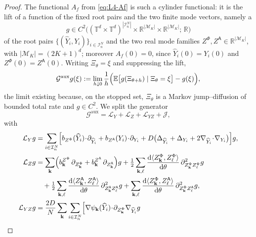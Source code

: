 \documentclass[a4paper,fleqn]{cas-sc}
\theoremstyle{definition}
\theoremstyle{remark}
\begin{document}
\begin{proof}
The functional $A_f$ from \eqref{eq:L4-Af} is such a cylinder functional: it is the lift of a
function of the fixed root pairs and the two finite mode vectors, namely a
\[
g\in C^2\bigl((\mathbb T^d\times\mathbb T^d)^{|\mathcal I^N_n|}\times\mathbb R^{|\mathcal M_K|}\times\mathbb R^{|\mathcal M_K|};\,\mathbb R\bigr)
\]
of the root pairs $\{(\widehat Y_i,Y_i)\}_{i\in\mathcal I^N_n}$ and the two real mode families
$Z^\Phi,Z^{\mathsf A}\in\mathbb R^{|\mathcal M_K|}$, with $|\mathcal M_K|=(2K+1)^d$; moreover $A_f(0)=0$,
since $\widehat Y_i(0)=Y_i(0)$ and $Z^\Phi(0)=Z^{\mathsf A}(0)$. Writing $\Xi_\theta=\xi$ and
suppressing the lift,
\begin{equation}\label{eq:L4-gendef}
\mathcal G^{\mathrm{aux}}g(\xi)
:=\lim_{h\downarrow0}\frac1h\Bigl(\mathbb E\bigl[g(\Xi_{\theta+h})\mid\Xi_\theta=\xi\bigr]-g(\xi)\Bigr),
\end{equation}
the limit existing because, on the stopped set, $\Xi_\theta$ is a Markov jump--diffusion of bounded
total rate and $g\in C^2$.
We split the generator
\begin{equation}\label{eq:L4-split}
\mathcal G^{\mathrm{aux}}=\mathcal L_Y+\mathcal L_Z+\mathcal L_{YZ}+\mathcal J,
\end{equation}
with
\begin{equation}\label{eq:L4-genops}
\begin{aligned}
\mathcal L_Yg&=\sum_{i\in\mathcal I^N_n}\Bigl[
b_{Z^\Phi}(\widehat Y_i)\!\cdot\!\partial_{\widehat Y_i}
+b_{Z^{\mathsf A}}(Y_i)\!\cdot\!\partial_{Y_i}
+D\bigl(\Delta_{\widehat Y_i}+\Delta_{Y_i}+2\nabla_{\widehat Y_i}\!\cdot\!\nabla_{Y_i}\bigr)\Bigr]g,\\
\mathcal L_Zg&=\sum_{\mathbf k}\Bigl(b^{Z^\Phi}_{\mathbf k}\,\partial_{Z^\Phi_{\mathbf k}}
+b^{Z^{\mathsf A}}_{\mathbf k}\,\partial_{Z^{\mathsf A}_{\mathbf k}}\Bigr)g
+\tfrac12\sum_{\mathbf k,\ell}\frac{\mathrm d\langle Z^\Phi_{\mathbf k},Z^\Phi_\ell\rangle}{\mathrm d\theta}\,\partial^2_{Z^\Phi_{\mathbf k}Z^\Phi_\ell}g\\
&\quad+\tfrac12\sum_{\mathbf k,\ell}\frac{\mathrm d\langle Z^{\mathsf A}_{\mathbf k},Z^{\mathsf A}_\ell\rangle}{\mathrm d\theta}\,\partial^2_{Z^{\mathsf A}_{\mathbf k}Z^{\mathsf A}_\ell}g
+\sum_{\mathbf k,\ell}\frac{\mathrm d\langle Z^\Phi_{\mathbf k},Z^{\mathsf A}_\ell\rangle}{\mathrm d\theta}\,\partial^2_{Z^\Phi_{\mathbf k}Z^{\mathsf A}_\ell}g,\\
\mathcal L_{YZ}g&=\frac{2D}{N}\sum_{\mathbf k}\sum_{i\in\mathcal I^N_n}\Bigl[
\nabla\psi_{\mathbf k}(\widehat Y_i)\!\cdot\!\partial_{Z^\Phi_{\mathbf k}}\nabla_{\widehat Y_i}g

\end{aligned}
\end{equation}
\end{proof}
\end{document}
